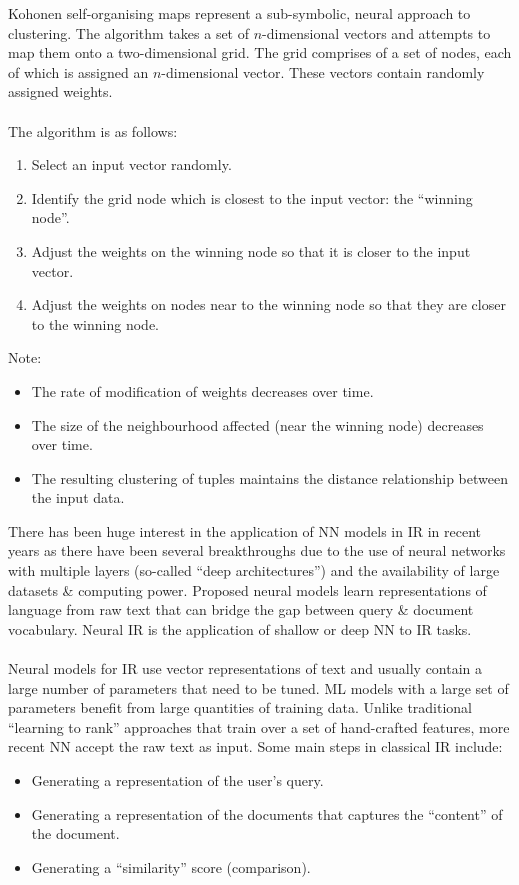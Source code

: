 \documentclass[a4paper,11pt]{article}
\begin{document}
\begin{tcolorbox}[breakable, colback=gray!10, colframe=black, title=\textbf{Case Study: Self-Organising Maps (Kohonen)}]
Kohonen self-organising maps represent a sub-symbolic, neural approach to clustering.
The algorithm takes a set of $n$-dimensional vectors and attempts to map them onto a two-dimensional grid.
The grid comprises of a set of nodes, each of which is assigned an $n$-dimensional vector.
These vectors contain randomly assigned weights.
\\\\
The algorithm is as follows:
\begin{enumerate}
    \item   Select an input vector randomly.
    \item   Identify the grid node which is closest to the input vector: the ``winning node''.
    \item   Adjust the weights on the winning node so that it is closer to the input vector.
    \item   Adjust the weights on nodes near to the winning node so that they are closer to the winning node.
\end{enumerate}

Note:
\begin{itemize}
    \item   The rate of modification of weights decreases over time.
    \item   The size of the neighbourhood affected (near the winning node) decreases over time.
    \item   The resulting clustering of tuples maintains the distance relationship between the input data.
\end{itemize}
\end{tcolorbox}

There has been huge interest in the application of NN models in IR in recent years as there have been several breakthroughs due to the use of neural networks with multiple layers (so-called ``deep architectures'') and the availability of large datasets \& computing power.
Proposed neural models learn representations of language from raw text that can bridge the gap between query \& document vocabulary.
Neural IR is the application of shallow or deep NN to IR tasks.
\\\\
Neural models for IR use vector representations of text and usually contain a large number of parameters that need to be tuned.
ML models with a large set of parameters benefit from large quantities of training data.
Unlike traditional ``learning to rank'' approaches that train over a set of hand-crafted features, more recent NN accept the raw text as input.
Some main steps in classical IR include:
\begin{itemize}
    \item   Generating a representation of the user's query.
    \item   Generating a representation of the documents that captures the ``content'' of the document.
    \item   Generating a ``similarity'' score (comparison).
\end{itemize}
\end{document}
